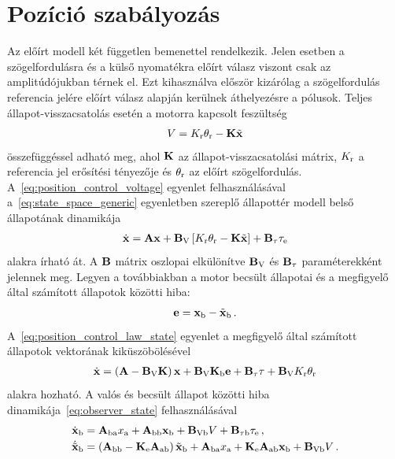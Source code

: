 \section{Pozíció szabályozás}
Az előírt modell két független bemenettel rendelkezik. Jelen esetben a szögelfordulásra és a 
külső nyomatékra előírt válasz viszont csak az amplitúdójukban térnek el. Ezt kihasználva először kizárólag a szögelfordulás referencia jelére előírt válasz alapján 
kerülnek áthelyezésre a pólusok. Teljes állapot-visszacsatolás esetén a motorra kapcsolt feszültség
\begin{align}\label{eq:position_control_voltage}
    V = K_{\mathrm{r}} \theta_{\mathrm{r}} -\mathbf{K} \tilde{\mathbf{x}}
\end{align}
összefüggéssel adható meg, 
ahol $\mathbf{K}$ az állapot-visszacsatolási mátrix, 
$K_{\mathrm{r}}$ a referencia jel erősítési tényezője és
$\theta_{\mathrm{r}}$ az előírt szögelfordulás. A~\eqref{eq:position_control_voltage} egyenlet felhasználásával
a~\eqref{eq:state_space_generic} egyenletben szereplő állapottér modell belső állapotának dinamikája
\begin{align}\label{eq:position_control_law_state}
    \dot{\mathbf{x}} = \mathbf{A} \mathbf{x} + \mathbf{B}_{\mathrm{V}}\left[K_{\mathrm{r}} \theta_{\mathrm{r}} - \mathbf{K} \tilde{\mathbf{x}}\right] + \mathbf{B}_{\mathrm{\tau}} \tau_{\mathrm{e}}
\end{align}
alakra írható át. A $\mathbf{B}$ mátrix oszlopai elkülönítve $\mathbf{B}_{\mathrm{V}}$ és $\mathbf{B}_{\mathrm{\tau}}$ paraméterekként jelennek meg.
Legyen a továbbiakban a motor becsült állapotai és a megfigyelő által számított állapotok közötti hiba:
\begin{align}
    \mathbf{e} = \mathbf{x}_{\mathrm{b}} - \tilde{\mathbf{x}}_{\mathrm{b}}\,.
\end{align}
A~\eqref{eq:position_control_law_state} egyenlet a megfigyelő által számított állapotok 
vektorának kiküszöbölésével
\begin{align}
    \dot{\mathbf{x}} = \left(\mathbf{A} - \mathbf{B}_{\mathrm{V}} \mathbf{K}\right) \mathbf{x} + 
    \mathbf{B}_{\mathrm{V}} \mathbf{K}_{\mathrm{b}} \mathbf{e} + 
    \mathbf{B}_{\mathrm{\tau}} \tau + 
    \mathbf{B}_{\mathrm{V}} K_{\mathrm{r}} \theta_{\mathrm{r}}
\end{align}
alakra hozható. A valós és becsült állapot közötti hiba dinamikája~\eqref{eq:observer_state} felhasználásával
\begin{equation}
    \begin{split}
    \dot{\mathbf{x}}_{\mathrm{b}} &= \mathbf{A}_{\mathrm{ba}} x_{\mathrm{a}} + \mathbf{A}_{\mathrm{bb}} \mathbf{x}_{\mathrm{b}} + 
    \mathbf{B}_{\mathrm{Vb}} V + \mathbf{B}_{\mathrm{\tau b}} \tau_{\mathrm{e}}\,,\\
    \dot{\tilde{\mathbf{x}}}_{\mathrm{b}} &= \left(\mathbf{A}_{\mathrm{bb}} - \mathbf{K}_{\mathrm{e}} \mathbf{A}_{\mathrm{ab}}\right) \tilde{\mathbf{x}}_{\mathrm{b}} +
    \mathbf{A}_{\mathrm{ba}} x_{\mathrm{a}} +
    \mathbf{K}_{\mathrm{e}} \mathbf{A}_{\mathrm{ab}} \mathbf{x}_{\mathrm{b}} +
    \mathbf{B}_{\mathrm{Vb}} V\,.
    \end{split}
\end{equation}
